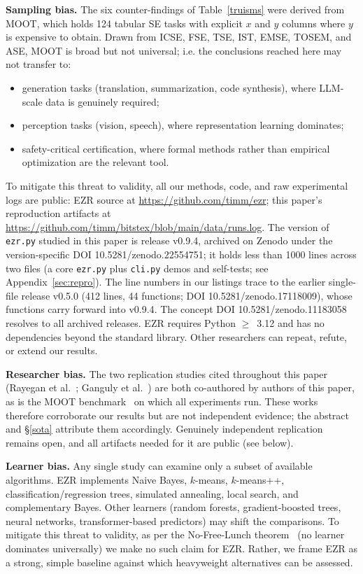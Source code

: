 \documentclass[AMA,STIX2COL]{WileyNJDv5}
\newcommand{\NEW}[1]{\textcolor{newblue}{#1}}
\newcommand{\IT}{{\sffamily EZR}}
\begin{document}
\textbf{Sampling bias.} The six counter-findings of
Table~\ref{truisms} were derived from MOOT, which holds 124
tabular SE tasks with explicit $x$ and $y$ columns where $y$
is expensive to obtain. Drawn from ICSE, FSE, TSE, IST, EMSE,
TOSEM, and ASE, MOOT is broad but not universal;
i.e. the 
conclusions reached here may not transfer to:
\begin{itemize}
\item generation tasks (translation, summarization, code
synthesis), where LLM-scale data is genuinely required;
\item perception tasks (vision, speech), where representation
learning dominates;
\item safety-critical certification, where formal methods
rather than empirical optimization are the relevant tool.
\end{itemize}
To mitigate this threat to validity,
all our methods, code, and raw experimental logs
are public:
\IT{} source at
\url{https://github.com/timm/ezr};
this paper's reproduction artifacts at
\url{https://github.com/timm/bitstex/blob/main/data/runs.log}.
\NEW{The version of \texttt{ezr.py} studied in this paper is
release \textsf{v0.9.4}, archived on Zenodo under the
version-specific DOI \textsf{10.5281/zenodo.22554751}; it holds
less than 1000 lines across two files (a core \texttt{ezr.py}
plus \texttt{cli.py} demos and self-tests; see
Appendix~\ref{sec:repro}). The line numbers in our listings
trace to the earlier single-file release \textsf{v0.5.0} (412
lines, 44 functions; DOI \textsf{10.5281/zenodo.17118009}),
whose functions carry forward into \textsf{v0.9.4}. The concept
DOI \textsf{10.5281/zenodo.11183058} resolves to all archived
releases.} \IT{} requires Python
$\geq$~3.12 and has no dependencies beyond the standard library.
Other researchers can repeat, refute, or extend our results.

\textbf{Researcher bias.} The two replication studies cited
throughout this paper (Rayegan et al.~\cite{Amiraliminimaldata};
Ganguly et al.~\cite{ganguly2026lowgodatalightse}) are both
co-authored by \NEW{authors of this paper}, as is the MOOT
benchmark~\cite{menzies2025moot} on which all experiments run.
These works therefore corroborate our results but are not
independent evidence; the abstract and \S\ref{sota} attribute
them accordingly. Genuinely independent replication remains
open, and all artifacts needed for it are public (see below).

\textbf{Learner bias.} Any single study can examine only a subset
of available algorithms. \IT{} implements Naive Bayes,
$k$-means, $k$-means++, classification/regression trees,
simulated annealing, local search, and complementary Bayes.
Other learners (random forests, gradient-boosted trees,
neural networks, transformer-based predictors) may shift the
comparisons.
To mitigate this threat to validity,
as per the No-Free-Lunch
theorem~\cite{wolpert1997nfl} (no learner dominates
universally) we make no such claim for \IT{}. Rather, we frame
\IT{} as a strong, simple baseline against which
heavyweight alternatives can be assessed.
\end{document}
